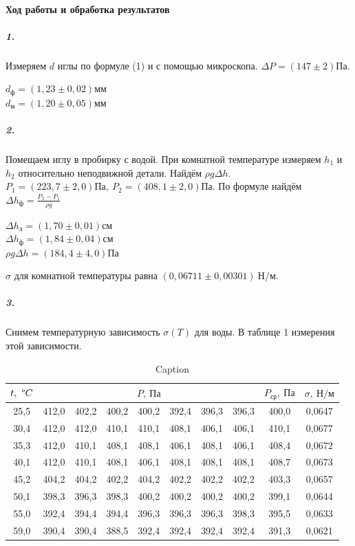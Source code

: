 \documentclass[a4paper,12pt]{article}
\begin{document}
\paragraph{Ход работы и обработка результатов}
\subparagraph{1.}Измеряем $d$ иглы по формуле (1) и с помощью микроскопа. $\Delta P = (147\pm 2) \text{Па}$.
\begin{center}
    $d_{\text{ф}}=(1,23\pm 0,02)\text{мм}$\\
    $d_{\text{м}}=(1,20\pm 0,05)\text{мм}$
\end{center}
\subparagraph{2.}Помещаем иглу в пробирку с водой. При комнатной температуре измеряем $h_1$ и $h_2$ относительно неподвижной детали. Найдём $\rho g\Delta h$. $P_1=(223,7\pm 2,0)\text{Па},~P_2=(408,1\pm 2,0)\text{Па}$. По формуле найдём $\Delta h_{\text{ф}}=\frac{P_2-P_1}{\rho g}$
\begin{center}
    $\Delta h_{\text{л}}=(1,70\pm 0,01)см$\\
    $\Delta h_{\text{ф}}=(1,84\pm 0,04)см$\\
    $\rho g \Delta h = (184,4 \pm 4,0)Па$
\end{center}
$\sigma$ для комнатной температуры равна $(0,06711\pm 0,00301)~Н/м$.
\subparagraph{3.}Снимем температурную зависимость $\sigma(T)$ для воды. В таблице 1 измерения этой зависимости. 
\newpage
\begin{table}[h]
    \centering
    \begin{tabular}{|c|c|c|c|c|c|c|c|c|c|}
    \hline
        $t,~ \degree C$ & \multicolumn{7}{|c|}{$P,~Па$} & $P_{\text{ср}}, ~ Па$ & $\sigma,~ Н/м$ \\ \hline
        25,5 & 412,0 & 402,2 & 400,2 & 400,2 & 392,4 & 396,3 & 396,3 & 400,0 & 0,0647 \\ \hline
        30,4 & 412,0 & 412,0 & 410,1 & 410,1 & 408,1 & 406,1 & 406,1 & 410,1 & 0,0677 \\ \hline
        35,3 & 412,0 & 410,1 & 408,1 & 408,1 & 406,1 & 408,1 & 406,1 & 408,4 & 0,0672 \\ \hline
        40,1 & 412,0 & 410,1 & 408,1 & 406,1 & 408,1 & 408,1 & 408,1 & 408,7 & 0,0673 \\ \hline
        45,2 & 404,2 & 404,2 & 402,2 & 404,2 & 402,2 & 402,2 & 402,2 & 403,3 & 0,0657 \\ \hline
        50,1 & 398,3 & 396,3 & 398,3 & 400,2 & 400,2 & 400,2 & 400,2 & 399,1 & 0,0644 \\ \hline
        55,0 & 392,4 & 394,4 & 394,4 & 396,3 & 396,3 & 396,3 & 398,3 & 395,5 & 0,0633 \\ \hline
        59,0 & 390,4 & 390,4 & 388,5 & 392,4 & 392,4 & 392,4 & 392,4 & 391,3 & 0,0621 \\ \hline
    \end{tabular}
    \caption{Caption}
    \label{tab:my_label}
\end{table}
\end{document}
